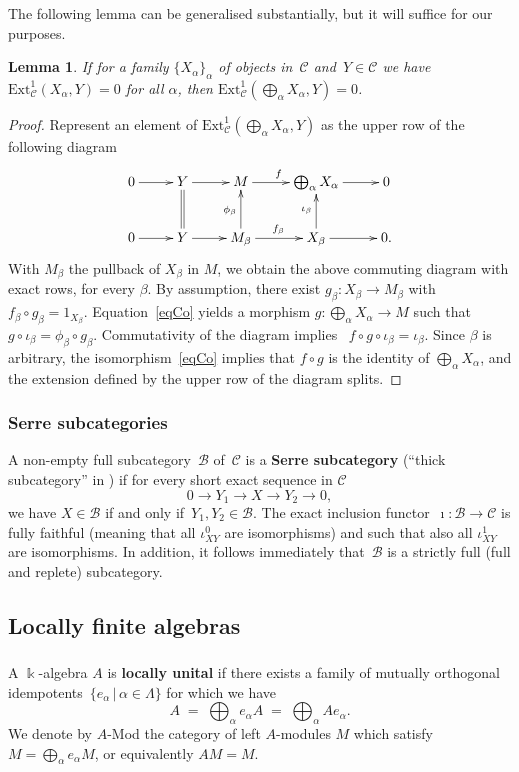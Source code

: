 \documentclass[11pt]{amsart}
\newcommand{\cB}{\mathcal B}
\newcommand{\Ext}{\mathrm{Ext}}
\newcommand{\mk}{\Bbbk}
\newcommand{\cC}{\mathcal{C}}
\numberwithin{equation}{section}
\theoremstyle{plain}
\newtheorem{lemma}[subsubsection]{Lemma}
\theoremstyle{remark}
\theoremstyle{remark}
\theoremstyle{construction}
\begin{document}
The following lemma can be generalised substantially, but it will suffice for our purposes.
\begin{lemma}\label{LemCopr}
If for a family $\{X_\alpha\}_\alpha$ of objects in~$\cC$ and~$Y\in\cC$ we have $\Ext^1_{\cC}(X_\alpha,Y)=0$ for all $\alpha$, then $\Ext^1_{\cC}(\bigoplus_\alpha X_\alpha,Y)=0$.
\end{lemma}
\begin{proof}
Represent an element of $\Ext^1_{\cC}(\bigoplus_\alpha X_\alpha,Y)$ as the upper {row} of the following diagram
$$\xymatrix{0\ar[r]& Y\ar@{=}[d]\ar[r]& M\ar[r]^f&\bigoplus_\alpha X_\alpha\ar[r]&0\\
0\ar[r]& Y\ar[r]& M_\beta\ar[r]^{f_\beta}\ar[u]^{\phi_\beta}& X_\beta\ar[r]\ar[u]^{\iota_\beta}&0.
}$$
With $M_\beta$ the pullback of $X_\beta$ in $M$, we obtain the above commuting diagram with exact rows, for every $\beta$. By assumption, there exist $g_\beta: X_\beta\to M_\beta$ with $f_\beta\circ g_\beta=1_{X_\beta}$. Equation~\eqref{eqCo} yields a morphism $g:\bigoplus_\alpha X_\alpha\to M$ such that~$g\circ\iota_\beta =\phi_\beta\circ g_\beta$. Commutativity of the diagram implies ~$f\circ g\circ\iota_\beta=\iota_\beta$. Since $\beta$ is arbitrary, {the} isomorphism~\eqref{eqCo} implies that $f\circ g$ is the identity of $\bigoplus_\alpha X_\alpha${,} and the extension defined by the upper row of the diagram splits.
\end{proof}


\subsubsection{Serre subcategories}
A non-empty full subcategory~$\cB$ of~$\cC$ is a {\bf Serre subcategory} (``thick subcategory'' in \cite{Gabriel}) if for every short exact sequence in $\cC$
$$0\to Y_1\to X\to Y_2\to 0,$$
we have $X\in \cB$ if and only if~$Y_1,Y_2\in \cB$. The exact inclusion functor~$\imath:\cB\to \cC$ is fully faithful (meaning that all $\iota^0_{XY}$ are isomorphisms) and such that also all $\iota^1_{XY}$ are isomorphisms. In addition, it follows immediately that~$\cB$ is a strictly full (full and replete) subcategory.




\subsection{Locally finite algebras} 

\subsubsection{}A $\mk$-algebra $A$ is {\bf locally unital} if there exists a family of mutually orthogonal idempotents~$\{e_\alpha\,|\, \alpha\in\Lambda\}$ for which we have
$$A\;=\;\bigoplus_{\alpha}e_\alpha A\;=\; \bigoplus_\alpha Ae_\alpha.$$
We denote by $A$-Mod the category of left $A$-modules $M$ which satisfy $M=\bigoplus_\alpha e_\alpha M$, or equivalently $AM=M$.
\end{document}

